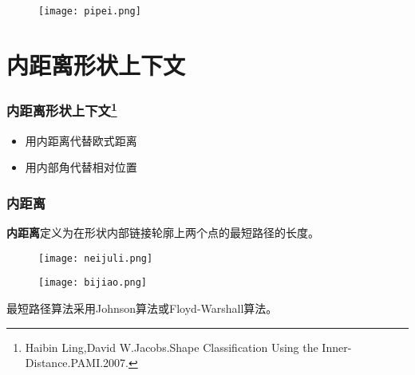 \documentclass[notheorems,mathserif,table,compress]{beamer}  %
\begin{document}
\begin{comment}
\begin{frame}
\frametitle{匈牙利算法}
找到两个子集之间的最大匹配关系。
   \begin{figure}[!ht]
    \begin{minipage}{0.4\textwidth}
    \centering
    \texttt{[image: xiong1.png]}

    \end{minipage}
    \begin{minipage}{0.4\textwidth}
    \centering
    \texttt{[image: xiong2.png]}

    \end{minipage}
    \begin{minipage}{0.4\textwidth}
    \centering
    \texttt{[image: xiong3.png]}

    \end{minipage}
   \end{figure}
\end{frame}
\end{comment}

\begin{frame}


   \begin{figure}[!ht]
    \centering
    \texttt{[image: pipei.png]}
   \end{figure}
\end{frame}

\section{内距离形状上下文}   
 
\begin{frame}
\frametitle{内距离形状上下文\footnote{Haibin Ling,David W.Jacobs.Shape Classification Using the Inner-Distance.PAMI.2007.}}
\begin{itemize}
\item 用内距离代替欧式距离
\item 用内部角代替相对位置
\end{itemize}
\end{frame}

\begin{frame}
\frametitle{内距离}
{\color{blue}\textbf{内距离}}定义为在形状内部链接轮廓上两个点的最短路径的长度。
   \begin{figure}[!ht]
    \centering
    \texttt{[image: neijuli.png]}
   \end{figure}
   \begin{figure}[!ht]
    \centering
    \texttt{[image: bijiao.png]}
   \end{figure}
{\color{blue}最短路径算法}采用Johnson算法或Floyd-Warshall算法。
\end{frame}      
\end{document}
